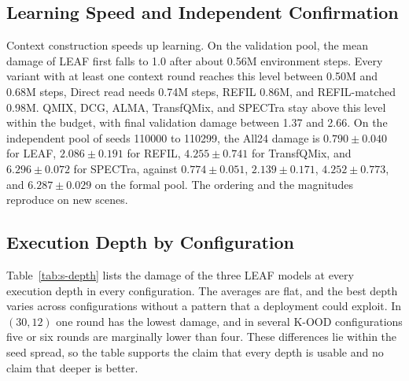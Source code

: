 \subsection{Learning Speed and Independent Confirmation}
Context construction speeds up learning. On the validation pool, the mean damage of LEAF first falls to 1.0 after about 0.56M environment steps. Every variant with at least one context round reaches this level between 0.50M and 0.68M steps, Direct read needs 0.74M steps, REFIL 0.86M, and REFIL-matched 0.98M. QMIX, DCG, ALMA, TransfQMix, and SPECTra stay above this level within the budget, with final validation damage between 1.37 and 2.66. On the independent pool of seeds 110000 to 110299, the All24 damage is $0.790\pm0.040$ for LEAF, $2.086\pm0.191$ for REFIL, $4.255\pm0.741$ for TransfQMix, and $6.296\pm0.072$ for SPECTra, against $0.774\pm0.051$, $2.139\pm0.171$, $4.252\pm0.773$, and $6.287\pm0.029$ on the formal pool. The ordering and the magnitudes reproduce on new scenes.

\subsection{Execution Depth by Configuration}
Table~\ref{tab:s-depth} lists the damage of the three LEAF models at every execution depth in every configuration. The averages are flat, and the best depth varies across configurations without a pattern that a deployment could exploit. In $(30,12)$ one round has the lowest damage, and in several K-OOD configurations five or six rounds are marginally lower than four. These differences lie within the seed spread, so the table supports the claim that every depth is usable and no claim that deeper is better.

